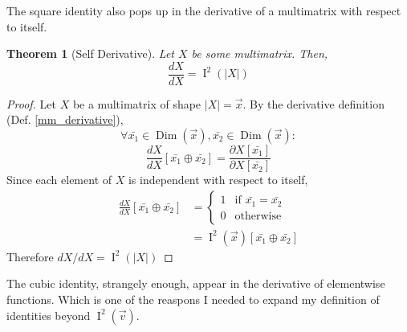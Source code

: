 \documentclass[12pt]{book}
\theoremstyle{plain}
\newtheorem{theorem}{Theorem}[chapter]
\theoremstyle{definition}
\theoremstyle{ppart}
\theoremstyle{case}
\theoremstyle{solution}
\DeclareMathOperator{\Dim}{Dim}
\DeclareMathOperator{\Ident}{I}
\begin{document}
The square identity also pops up in the derivative of a multimatrix
with respect to itself.

\begin{theorem}[Self Derivative]
\label{self_derivative}
Let $X$ be some multimatrix. Then,
\[ \frac{dX}{dX} = \Ident^2(|X|) \]
\end{theorem}
\begin{proof}
Let $X$ be a multimatrix of shape $|X|=\vec{x}$.
By the derivative definition (Def. \ref{mm_derivative}),
\[
 \forall \bar{x_1} \in \Dim(\vec{x}),
         \bar{x_2} \in \Dim(\vec{x}):
\]
\[
 \frac{dX}{dX}[\bar{x_1} \oplus \bar{x_2}] = 
 \frac{\partial X[\bar{x_1}]}{\partial X[\bar{x_2}]}
\]
Since each element of $X$ is independent with respect to itself,
\begin{align*}
 \frac{dX}{dX}[\bar{x_1} \oplus \bar{x_2}]
 &= \left\{
  \begin{array}{ll}
    1 & \mbox{if } \bar{x_1} = \bar{x_2} \\
    0 & \mbox{otherwise}
  \end{array}
 \right. \\
 &= \Ident^2(\vec{x})[\bar{x_1} \oplus \bar{x_2}]
\end{align*}
Therefore $dX/dX = \Ident^2(|X|)$
\end{proof}

The cubic identity, strangely enough, appear in the derivative of elementwise
functions. Which is one of the reaspons I needed to expand my definition of
identities beyond $\Ident^2(\vec{v})$.
\end{document}
